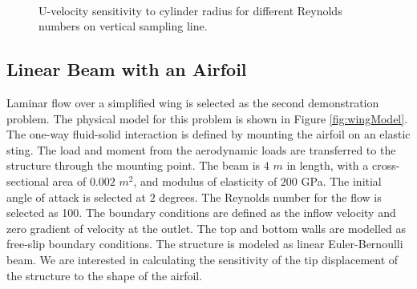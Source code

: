 \documentclass{aiaa-pretty}
\begin{document}
\begin{figure}[H]
{	}
	\quad
	\\
	\quad
	\caption{U-velocity sensitivity to cylinder radius for different Reynolds numbers on vertical sampling line.}
	\label{fig:cylinderVelocitySensitivity}
\end{figure}
%

\subsection{Linear Beam with an Airfoil}
Laminar flow over a simplified wing is selected as the second demonstration problem. The physical model for this problem is shown in Figure \ref{fig:wingModel}. The one-way fluid-solid interaction is defined by mounting the airfoil on an elastic sting. The load and moment from the aerodynamic loads are transferred to the structure through the mounting point. The beam is $4$ $m$ in length, with a cross-sectional area of $0.002$ $m^2$, and modulus of elasticity of $200$ GPa. The initial angle of attack is selected at $2$ degrees. The Reynolds number for the flow is selected as 100. The boundary conditions are defined as the inflow velocity and zero gradient of velocity at the outlet. The top and bottom walls are modelled as free-slip boundary conditions. The structure is modeled as linear Euler-Bernoulli beam. We are interested in calculating the sensitivity of the tip displacement of the structure to the shape of the airfoil.
\end{document}
